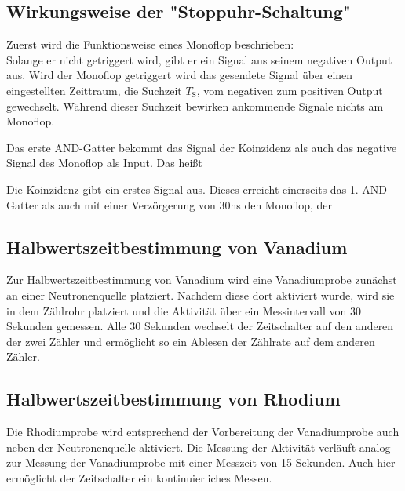     \subsection{Wirkungsweise der "Stoppuhr-Schaltung"}
        Zuerst wird die Funktionsweise eines Monoflop beschrieben: \\
        Solange er nicht getriggert wird, gibt er ein Signal aus seinem negativen Output aus.
        Wird der Monoflop getriggert wird das gesendete Signal über einen eingestellten Zeittraum, die Suchzeit $T_{\text{S}}$, vom negativen zum positiven Output gewechselt. Während dieser Suchzeit bewirken ankommende Signale nichts am Monoflop.

        Das erste AND-Gatter bekommt das Signal der Koinzidenz als auch das negative Signal des Monoflop als Input.
        Das heißt

        Die Koinzidenz gibt ein erstes Signal aus. Dieses erreicht einerseits das 1. AND-Gatter als auch mit einer Verzörgerung von $30$ns den Monoflop, der 

    \subsection{Halbwertszeitbestimmung von Vanadium}
        Zur Halbwertszeitbestimmung von Vanadium wird eine Vanadiumprobe zunächst an einer Neutronenquelle platziert. Nachdem diese dort aktiviert wurde, wird sie in dem Zählrohr platziert und 
        die Aktivität über ein Messintervall von 30 Sekunden gemessen. Alle 30 Sekunden wechselt der Zeitschalter auf den anderen der zwei Zähler und ermöglicht so ein Ablesen der Zählrate auf
        dem anderen Zähler.

    \subsection{Halbwertszeitbestimmung von Rhodium}
        Die Rhodiumprobe wird entsprechend der Vorbereitung der Vanadiumprobe auch neben der Neutronenquelle aktiviert. Die Messung der Aktivität verläuft analog zur Messung der Vanadiumprobe
        mit einer Messzeit von 15 Sekunden. Auch hier ermöglicht der Zeitschalter ein kontinuierliches Messen.
        
